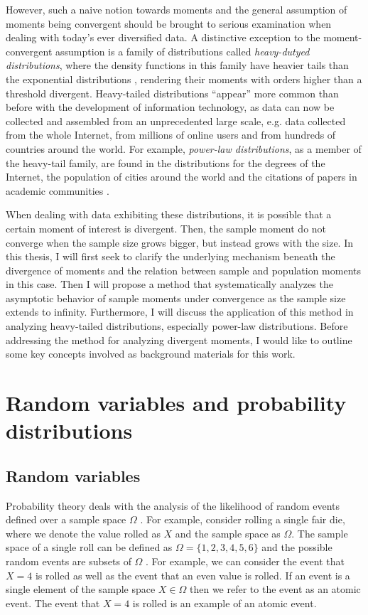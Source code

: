 However, such a naive notion towards moments and the general assumption of moments being convergent should be brought to serious examination when dealing with today's ever diversified data. A distinctive exception to the moment-convergent assumption is a family of distributions called \textit{heavy-dutyed distributions}, where the density functions in this family have heavier tails than the exponential distributions \cite{asmussen2003applied}, rendering their moments with orders higher than a threshold divergent. Heavy-tailed distributions ``appear'' more common than before with the development of information technology, as data can now be collected and assembled from an unprecedented large scale, e.g. data collected from the whole Internet, from millions of online users and from hundreds of countries around the world. For example, \textit{power-law distributions}, as a member of the heavy-tail family, are found in the distributions for the degrees of the Internet, the population of cities around the world and the citations of papers in academic communities \cite{Clauset2009}. 

When dealing with data exhibiting these distributions, it is possible that a certain moment of interest is divergent. Then, the sample moment do not converge when the sample size grows bigger, but instead grows with the size. In this thesis, I will first seek to clarify the underlying mechanism beneath the divergence of moments and the relation between sample and population moments in this case. Then I will propose a method that systematically analyzes the asymptotic behavior of sample moments under convergence as the sample size extends to infinity. Furthermore, I will discuss the application of this method in analyzing heavy-tailed distributions, especially power-law distributions. Before addressing the method for analyzing divergent moments, I would like to outline some key concepts involved as background materials for this work.

\section{Random variables and probability distributions}
\subsection{Random variables}
Probability theory deals with the analysis of the likelihood of random events defined over a sample space $ \Omega $ . For example, consider rolling a single fair die, where we denote the value rolled as $ X $ and the sample space as $ \Omega $. The sample space of a single roll can be defined as $\Omega = \{1, 2, 3, 4, 5, 6\}$ and the possible random events are subsets of $ \Omega $ . For example, we can consider the event that $ X=4 $  is rolled as well as the event that an even value is rolled. If an event is a single element of the sample space $ X \in \Omega $  then we refer to the event as an atomic event. The event that $ X=4 $  is rolled is an example of an atomic event.

